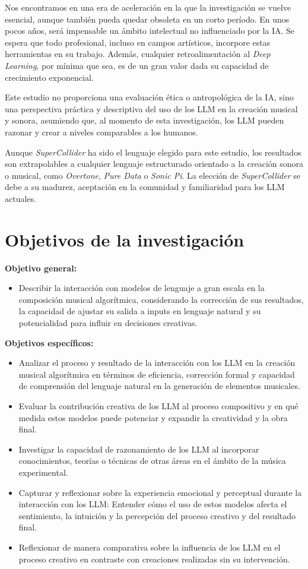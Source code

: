 Nos encontramos en una era de aceleración en la que la investigación se vuelve esencial, aunque también pueda quedar obsoleta en un corto período. En unos pocos años, será impensable un ámbito intelectual no influenciado por la IA. Se espera que todo profesional, incluso en campos artísticos, incorpore estas herramientas en su trabajo. Además, cualquier retroalimentación al \textit{Deep Learning}, por mínima que sea, es de un gran valor dada su capacidad de crecimiento exponencial.

Este estudio no proporciona una evaluación ética o antropológica de la IA, sino una perspectiva práctica y descriptiva del uso de los LLM en la creación musical y sonora, asumiendo que, al momento de esta investigación, los LLM pueden razonar y crear a niveles comparables a los humanos.

Aunque \textit{SuperCollider} ha sido el lenguaje elegido para este estudio, los resultados son extrapolables a cualquier lenguaje estructurado orientado a la creación sonora o musical, como \textit{Overtone}, \textit{Pure Data} o \textit{Sonic Pi}. La elección de \textit{SuperCollider} se debe a su madurez, aceptación en la comunidad y familiaridad para los LLM actuales.


\section{Objetivos de la investigación}

\textbf{Objetivo general:}
\begin{itemize}
    \item Describir la interacción con modelos de lenguaje a gran escala en la composición musical algorítmica, considerando la corrección de sus resultados, la capacidad de ajustar su salida a inputs en lenguaje natural y su potencialidad para influir en decisiones creativas.
\end{itemize}

\textbf{Objetivos específicos:}
\begin{itemize}
    \item Analizar el proceso y resultado de la interacción con los LLM en la creación musical algorítmica en términos de eficiencia, corrección formal y capacidad de comprensión del lenguaje natural en la generación de elementos musicales.
    \item Evaluar la contribución creativa de los LLM al proceso compositivo y en qué medida estos modelos puede potenciar y expandir la creatividad y la obra final.
    \item Investigar la capacidad de razonamiento de los LLM al incorporar conocimientos, teorías o técnicas de otras áreas en el ámbito de la música experimental.
    \item Capturar y reflexionar sobre la experiencia emocional y perceptual durante la interacción con los LLM: Entender cómo el uso de estos modelos afecta el sentimiento, la intuición y la percepción del proceso creativo y del resultado final.
    \item Reflexionar de manera comparativa sobre la influencia de los LLM en el proceso creativo en contraste con creaciones realizadas sin su intervención.
\end{itemize}
